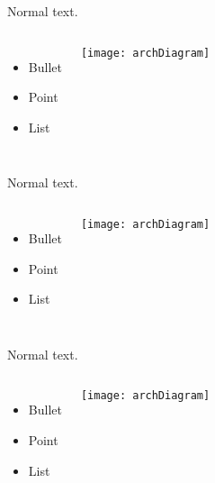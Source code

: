 \begin{frame}
  Normal text.

  \begin{columns}
      \begin{itemize}
      \item Bullet
      \item Point
      \item List
      \end{itemize}

      \texttt{[image: archDiagram]}
    \end{columns}
  
\end{frame}

\begin{frame}
  Normal text.

  \begin{columns}
      \begin{itemize}
      \item Bullet
      \item Point
      \item List
      \end{itemize}

      \texttt{[image: archDiagram]}
    \end{columns}
  
\end{frame}

\begin{frame}
  Normal text.

  \begin{columns}
      \begin{itemize}
      \item Bullet
      \item Point
      \item List
      \end{itemize}

      \texttt{[image: archDiagram]}
    \end{columns}
  
\end{frame}